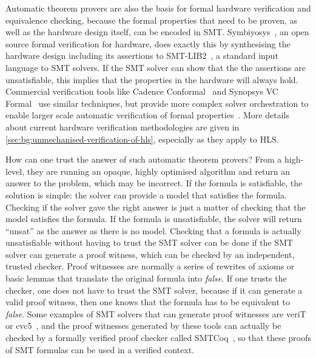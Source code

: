 Automatic theorem provers are also the basis for formal hardware verification
and equivalence checking, because the formal properties that need to be proven,
as well as the hardware design itself, can be encoded in \gls{SMT}.
Symbiyosys~\cite{yosyshq23_symbiyosys}, an open source formal verification for
hardware, does exactly this by synthesising the hardware design including its
assertions to SMT-LIB2~\cite{barrett17_sls}, a standard input language to
\gls{SMT} solvers.  If the \gls{SMT} solver can show that the the assertions are
unsatisfiable, this implies that the properties in the hardware will always
hold.  Commercial verification tools like Cadence Conformal~\cite[]{cadence23_c}
and Synopsys VC Formal~\cite[]{synopsys23_v} use similar techniques, but provide
more complex solver orchestration to enable larger scale automatic verification
of formal properties~\cite{koelbl09_sr}.  More details about current hardware
verification methodologies are given in
\cref{sec:bg:unmechanised-verification-of-hls}, especially as they apply to
\gls{HLS}.

How can one trust the answer of such automatic theorem provers?  From a
high-level, they are running an opaque, highly optimised algorithm and return an
answer to the problem, which may be incorrect.  If the formula is satisfiable,
the solution is simple: the solver can provide a model that satisfies the
formula.  Checking if the solver gave the right answer is just a matter of
checking that the model satisfies the formula.  If the formula is unsatisfiable,
the solver will return \enquote{unsat} as the answer as there is no model.
Checking that a formula is actually unsatisfiable without having to trust the
\gls{SMT} solver can be done if the \gls{SMT} solver can generate a proof
witness, which can be checked by an independent, trusted checker.  Proof
witnesses are normally a series of rewrites of axioms or basic lemmas that
translate the original formula into \textit{false}.  If one trusts the checker,
one does not have to trust the \gls{SMT} solver, because if it can generate a
valid proof witness, then one knows that the formula has to be equivalent to
\textit{false}.  Some examples of \gls{SMT} solvers that can generate proof
witnesses are veriT~\cite{bouton09} or cvc5~\cite[]{barbosa22_cvc5}, and the
proof witnesses generated by these tools can actually be checked by a formally
verified proof checker called SMTCoq~\cite{armand11_modul_integ_sat_smt_solver},
so that these proofs of \gls{SMT} formulas can be used in a verified context.

